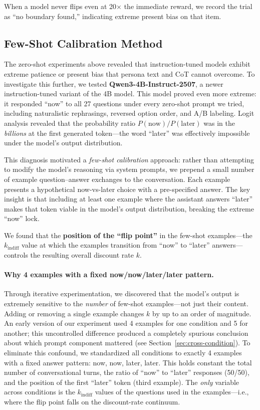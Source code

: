 \documentclass[11pt,a4paper]{article}
\begin{document}
When a model never flips even at 20$\times$ the immediate reward, we record the trial as ``no boundary found,'' indicating extreme present bias on that item.

\subsection{Few-Shot Calibration Method}
\label{sec:fewshot-method}

The zero-shot experiments above revealed that instruction-tuned models exhibit extreme patience or present bias that persona text and CoT cannot overcome. To investigate this further, we tested \textbf{Qwen3-4B-Instruct-2507}, a newer instruction-tuned variant of the 4B model. This model proved even more extreme: it responded ``now'' to all 27 questions under every zero-shot prompt we tried, including naturalistic rephrasings, reversed option order, and A/B labeling. Logit analysis revealed that the probability ratio $P(\text{now})/P(\text{later})$ was in the \emph{billions} at the first generated token---the word ``later'' was effectively impossible under the model's output distribution.

This diagnosis motivated a \emph{few-shot calibration} approach: rather than attempting to modify the model's reasoning via system prompts, we prepend a small number of example question--answer exchanges to the conversation. Each example presents a hypothetical now-vs-later choice with a pre-specified answer. The key insight is that including at least one example where the assistant answers ``later'' makes that token viable in the model's output distribution, breaking the extreme ``now'' lock.

We found that the \textbf{position of the ``flip point''} in the few-shot examples---the $k_{\text{indiff}}$ value at which the examples transition from ``now'' to ``later'' answers---controls the resulting overall discount rate $k$.

\paragraph{Why 4 examples with a fixed now/now/later/later pattern.} Through iterative experimentation, we discovered that the model's output is extremely sensitive to the \emph{number} of few-shot examples---not just their content. Adding or removing a single example changes $k$ by up to an order of magnitude. An early version of our experiment used 4 examples for one condition and 5 for another; this uncontrolled difference produced a completely spurious conclusion about which prompt component mattered (see Section~\ref{sec:cross-condition}). To eliminate this confound, we standardized all conditions to exactly 4 examples with a fixed answer pattern: now, now, later, later. This holds constant the total number of conversational turns, the ratio of ``now'' to ``later'' responses (50/50), and the position of the first ``later'' token (third example). The \emph{only} variable across conditions is the $k_{\text{indiff}}$ values of the questions used in the examples---i.e., where the flip point falls on the discount-rate continuum.
\end{document}
